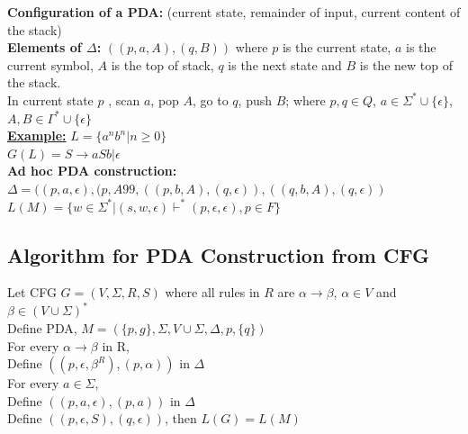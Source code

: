 \documentclass[12pt,a4paper]{article}
\begin{document}
\textbf{Configuration of a PDA:} (current state, remainder of input, current content of the stack)\\

\textbf{Elements of $\Delta$:} $((p,a,A),(q,B))$ where $p$ is the current state, $a$ is the current symbol, $A$ is the top of stack, $q$ is the next state and $B$ is the new top of the stack.\\

In current state $p$ , scan $a$, pop $A$, go to $q$, push $B$; where $p,q\in Q$, $a\in \Sigma^{*} \cup \lbrace \epsilon \rbrace$, $A,B \in \Gamma^{*} \cup \lbrace \epsilon \rbrace$\\

\underline{\textbf{Example:}} $L=\lbrace a^{n}b^{n}|n\geq0\rbrace$\\

$G(L)= S\rightarrow aSb|\epsilon$\\

\textbf{Ad hoc PDA construction:}\\

$\Delta= ((p,a,\epsilon),(p,A99,((p,b,A),(q,\epsilon)),((q,b,A),(q,\epsilon))$\\
 
$L(M)=\lbrace w\in \Sigma^{*}|(s,w,\epsilon)\vdash^{*}(p,\epsilon,\epsilon), p\in F\rbrace$\\

\subsection{Algorithm for PDA Construction from CFG}
Let CFG $G=(V,\Sigma,R,S)$ where all rules in $R$ are $\alpha \rightarrow \beta$, $\alpha \in V$ and $\beta \in (V\cup\Sigma)^*$\\

Define PDA, $M=(\lbrace p, g\rbrace,\Sigma, V\cup \Sigma,\Delta,p,\lbrace q\rbrace)$\\

For every $\alpha \rightarrow \beta$ in R,\\
Define $((p,\epsilon,\beta^R),(p,\alpha))$ in $\Delta$\\

For every $a \in \Sigma$,\\ 
Define $((p,a,\epsilon),(p,a))$ in $\Delta$\\
Define $((p,\epsilon,S),(q,\epsilon))$, then $L(G)=L(M)$\\

\clearpage
\end{document}
